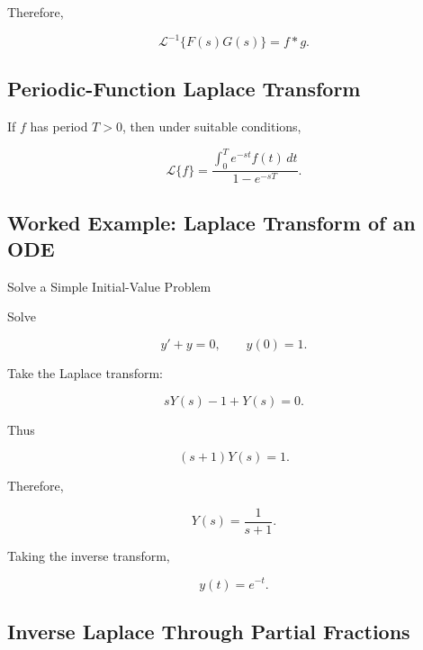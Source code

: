 Therefore,

\[
\boxed{
\mathcal{L}^{-1}\{F(s)G(s)\}
=
f*g.
}
\]

\subsection{Periodic-Function Laplace Transform}
\label{subsec:laplace-periodic-function}

If \(f\) has period \(T>0\), then under suitable conditions,

\[
\boxed{
\mathcal{L}\{f\}
=
\frac{
\displaystyle
\int_0^T
e^{-st}f(t)\,dt
}{
1-e^{-sT}
}.
}
\]

\subsection{Worked Example: Laplace Transform of an ODE}
\label{subsec:worked-laplace-ode}

\begin{workedexamplebox}{Solve a Simple Initial-Value Problem}

Solve

\[
y'+y=0,
\qquad
y(0)=1.
\]

Take the Laplace transform:

\[
sY(s)-1+Y(s)=0.
\]

Thus

\[
(s+1)Y(s)=1.
\]

Therefore,

\[
Y(s)
=
\frac{1}{s+1}.
\]

Taking the inverse transform,

\begin{answerbox}
\[
\boxed{
y(t)=e^{-t}.
}
\]
\end{answerbox}

\end{workedexamplebox}

\subsection{Inverse Laplace Through Partial Fractions}
\label{subsec:inverse-laplace-partial-fractions}

